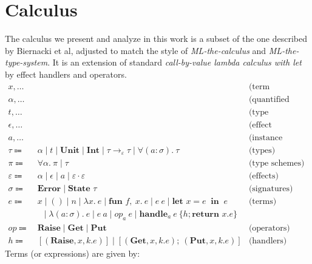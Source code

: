 \documentclass[declaration,shortabstract]{iithesis}
\theoremstyle{definition} \newtheorem{definition}{Definition}[section]
\newcommand{\arrow}[3]{{#1}\rightarrow_{#2}{#3}}
\newcommand{\lam}[1][x]{\ensuremath{\lambda #1.\:}}
\newcommand{\fun}[1][f,\:x]{\ensuremath{\textbf{fun } #1.\:}}
\begin{document}
\chapter{Calculus}
The calculus we present and analyze in this work
is a subset of the one described by Biernacki et al\cite{binders-labels},
 adjusted to match the style of \textit{ML-the-calculus} and \textit{ML-the-type-system}\cite{emlti}.
It is an extension of standard \textit{call-by-value lambda calculus with let} by effect handlers and operators. 
\begin{align*} 
x , \dots & & \text{(term variables)}
\\ 
\alpha , \dots& & \text{(quantified variables)}
\\ 
t , \dots & & \text{(type variables)}
\\ 
\epsilon , \dots & & \text{(effect variables)}
\\ 
a , \dots & & \text{(instance variables)}
\\ 
\tau \Coloneqq &\
\alpha \mid t \mid \textbf{Unit} \mid \textbf{Int} \mid \arrow{\tau}{\varepsilon}{\tau}
\mid \forall (a : \sigma) .\: \tau
 & \text{(types)}
\\
\pi \Coloneqq &\ \forall \alpha.\:\pi \mid \tau &\text{(type schemes)}
\\ 
\varepsilon \Coloneqq &\
\alpha \mid \epsilon \mid a \mid \varepsilon \cdot \varepsilon 
 & \text{(effects)}
\\ 
\sigma \Coloneqq &\ \textbf{Error} \mid \textbf{State } \tau& \text{(signatures)}
\\
e \Coloneqq &\ x \mid () \mid n \mid \lam e \mid \fun e \mid e \: e \mid \textbf{let } x = e \: \textbf{ in } \: e & \text{(terms)}
\\
 & \;\:\ \mid \lam[(a : \sigma)] e \mid e \: a \mid op_a \: e \mid \textbf{handle}_a \: e\: \{h; \textbf{return } x. e\}
\\
op \Coloneqq &\ \textbf{Raise} \mid \textbf{Get} \mid \textbf{Put} & \text{(operators)} 
\\ 
h \Coloneqq &\ [(\textbf{Raise}, x, k. e)] \mid [(\textbf{Get}, x, k. e);\ (\textbf{Put}, x, k. e)]& \text{(handlers)}
\end{align*}
Terms (or expressions) are given by:
\end{document}
